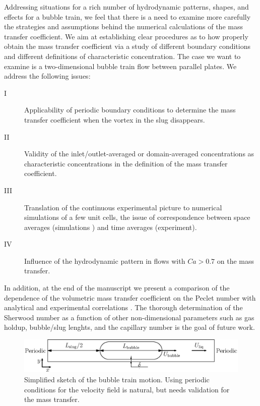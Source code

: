 \documentclass{article}
\begin{document}
Addressing situations for a rich number of hydrodynamic patterns, shapes, and
effects for a bubble train, we feel that there is a need to examine more
carefully the strategies and assumptions behind the numerical calculations
of the mass transfer coefficient. We aim at establishing clear
procedures as to how properly obtain the mass transfer coefficient via a study
of different boundary conditions and different definitions of characteristic concentration.
The case we want to examine is a two-dimensional bubble train flow between parallel plates.
We address the following issues:
 \begin{description}
 \item[I] Applicability of periodic boundary
conditions to determine the mass transfer coefficient when the vortex in the slug
disappears.
 \item[II] Validity of the inlet/outlet-averaged or domain-averaged concentrations as
characteristic concentrations in the definition of the mass transfer
coefficient.
 \item[III] Translation of the continuous experimental picture to
numerical simulations of a few unit cells, the issue of correspondence
between space averages (simulations \cite{vanbaten-circular}) and time averages (experiment).
 \item[IV] Influence of the hydrodynamic pattern in flows with $Ca>0.7$ on the mass transfer.
\end{description}
In addition, at the end of the manuscript we present a comparison of the dependence of the volumetric
mass transfer coefficient on the Peclet number with analytical \cite{irandoust} and experimental correlations
\cite{yue-mass}.  The thorough determination of the Sherwood number as a
function of other non-dimensional parameters such as gas holdup, bubble/slug
lenghts, and the capillary number is the goal of future work.
\begin{figure}[htb!]
\includegraphics[width=\textwidth]{Figures/benchmark_hydro.eps}
\caption{Simplified sketch of the bubble train motion. Using periodic
conditions for the velocity field is natural, but needs validation for the mass
transfer.
\label{fig:benchmark:hydro}}
\end{figure}
\end{document}
